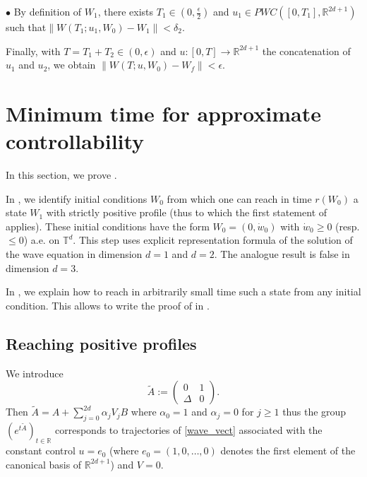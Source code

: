 \documentclass[a4paper]{article}
\theoremstyle{plain}
\newcommand{\T}{\mathbb{T}}
\newcommand{\R}{\mathbb{R}}
\begin{document}
\medskip

\noindent $\bullet$ By definition of $W_1$, there exists $T_1 \in (0,\frac{\epsilon}{2})$ and $u_1 \in PWC([0,T_1],\R^{2d+1})$ such that\newline$\| W(T_1;u_1,W_0)-W_1\|<\delta_2$.

\medskip

Finally, with $T=T_1+T_2 \in (0,\epsilon)$ and $u:[0,T] \to \R^{2d+1}$ the concatenation of $u_1$ and $u_2$, we obtain
$\|W(T;u,W_0)-W_f\|<\epsilon$.




\section{Minimum time for approximate controllability}
\label{sec:Tmin}

In this section, we prove . 

In , we identify initial conditions $W_0$ from which one can reach in time $r(W_0)$ a state $W_1$ with strictly positive profile (thus to which the first statement of  applies).
These initial conditions have the form $W_0=(0,\dot{w}_0)$ with $\dot{w}_0 \geq 0$ (resp. $\leq 0$) a.e. on $\T^d$. This step uses explicit representation formula of the solution of the wave equation in dimension $d=1$ and $d=2$. The analogue result is false in dimension $d=3$.

In , we explain how to reach in arbitrarily small time such a state from any initial condition. This allows to write the proof of  in .



\subsection{Reaching positive profiles}
\label{subsec:profile>0}

We introduce
\begin{equation} \label{def:Atilde}
\widetilde{A}:=\begin{pmatrix}
    0 & 1 \\ \Delta & 0
\end{pmatrix}.
\end{equation}
Then $\widetilde{A}=A+\sum_{j=0}^{2d} \alpha_j V_j B$ where $\alpha_0=1$ and $\alpha_j=0$ for $j \geq 1$ thus the group $(e^{t \widetilde{A}})_{t\in\R}$ corresponds to trajectories of \eqref{wave_vect} associated with the constant control $u=e_0$ (where $e_0=(1,0,\dots,0)$ denotes the first element of the canonical basis of $\R^{2d+1}$) and $V=0$.
\end{document}
